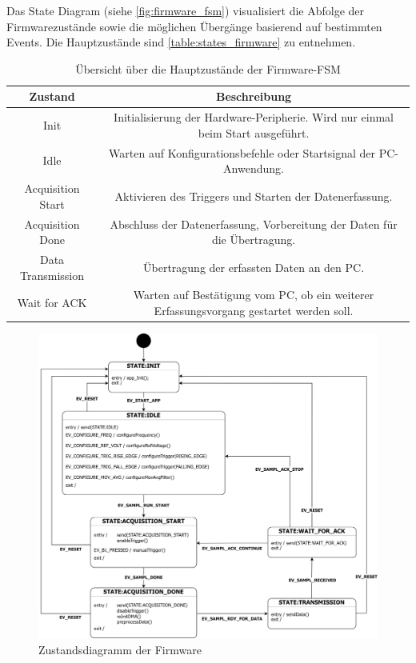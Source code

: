 \documentclass[a4paper, portrait, 12pt]{scrartcl} %
\begin{document}
Das State Diagram (siehe \autoref{fig:firmware_fsm}) visualisiert die Abfolge der Firmwarezustände sowie die möglichen Übergänge basierend auf bestimmten Events. Die Hauptzustände sind \autoref{table:states_firmware} zu entnehmen.
\pagebreak

\begin{table}[H]
\centering
\scriptsize
\begin{tabular}{|c|c|}
\hline 
\textbf{Zustand} & \textbf{Beschreibung} \\ 
\hline 
\hline
Init & Initialisierung der Hardware-Peripherie. Wird nur einmal beim Start ausgeführt. \\ 
\hline 
Idle & Warten auf Konfigurationsbefehle oder Startsignal der PC-Anwendung. \\ 
\hline 
Acquisition Start & Aktivieren des Triggers und Starten der Datenerfassung. \\ 
\hline 
Acquisition Done & Abschluss der Datenerfassung, Vorbereitung der Daten für die Übertragung. \\ 
\hline 
Data Transmission & Übertragung der erfassten Daten an den PC. \\ 
\hline 
Wait for ACK & Warten auf Bestätigung vom PC, ob ein weiterer Erfassungsvorgang gestartet werden soll. \\ 
\hline 
\end{tabular}
\caption{Übersicht über die Hauptzustände der Firmware-FSM}
\label{table:states_firmware}
\end{table}

\begin{figure}[H]
	\centering
    \includegraphics[scale=0.12]{StateDiagram_Firmware_V1.png} 
	\caption{Zustandsdiagramm der Firmware}
	\label{fig:firmware_fsm}
\end{figure}
\end{document}
